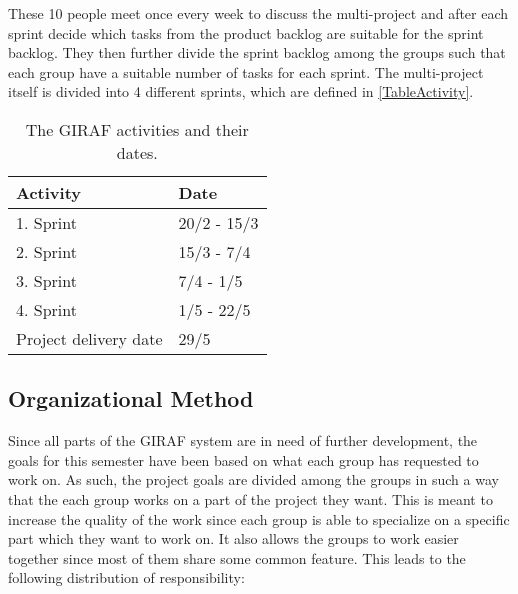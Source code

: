 
These 10 people meet once every week to discuss the multi-project and after each
sprint decide which tasks from the product backlog are suitable for the sprint
backlog. They then further divide the sprint backlog among the groups such that
each group have a suitable number of tasks for each sprint. The multi-project
itself is divided into 4 different sprints, which are defined in
\autoref{TableActivity}. 

\begin{table}[H]
\centering
\begin{tabular}{|l|l|}
\hline
Activity & Date \\ \hline
1. Sprint & 20/2 - 15/3 \\\hline 
2. Sprint & 15/3 - 7/4\\\hline 
3. Sprint & 7/4 - 1/5\\\hline 
4. Sprint & 1/5 - 22/5\\\hline 
Project delivery date & 29/5\\\hline
\end{tabular}
\caption{The GIRAF activities and their dates.}
\label{TableActivity}
\end{table}

\subsection{Organizational Method}
Since all parts of the GIRAF system are in need of further development, the
goals for this semester have been based on what each group has requested to work
on. As such, the project goals are divided among the groups in such
a way that the each group works on a part of the project they want. This is
meant to increase the quality of the work since each group is able to specialize
on a specific part which they want to work on. It also allows the groups to work
easier together since most of them share some common feature. This leads to the
following distribution of responsibility:

